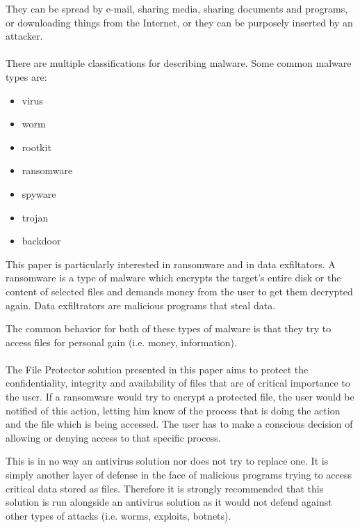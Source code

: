 	They can be spread by e-mail, sharing media, sharing documents and programs, or downloading things from the Internet, or they can be purposely inserted by an attacker\cite{CISSP}.
	
	\paragraph{}
	There are multiple classifications for describing malware. Some common malware types are:
	\begin{itemize}
		\item virus
		\item worm
		\item rootkit
		\item ransomware
		\item spyware
		\item trojan
		\item backdoor
	\end{itemize}

	This paper is particularly interested in ransomware and in data exfiltators. A ransomware is a type of malware which encrypts the target’s entire disk or the content of selected files and demands money from the user to get them decrypted again\cite{AnIntroductionToMalware}. Data exfiltrators are malicious programs that steal data. 
	
	The common behavior for both of these types of malware is that they try to access files for personal gain (i.e. money, information). 
	
	\paragraph{}
	The File Protector solution presented in this paper aims to protect the confidentiality, integrity and availability of files that are of critical importance to the user. If a ransomware would try to encrypt a protected file, the user would be notified of this action, letting him know of the process that is doing the action and the file which is being accessed. The user has to make a conscious decision of allowing or denying access to that specific process. 
	
	This is in no way an antivirus solution nor does not try to replace one. It is simply another layer of defense in the face of malicious programs trying to access critical data stored as files. Therefore it is strongly recommended that this solution is run alongside an antivirus solution as it would not defend against other types of attacks (i.e. worms, exploits, botnets).
	
